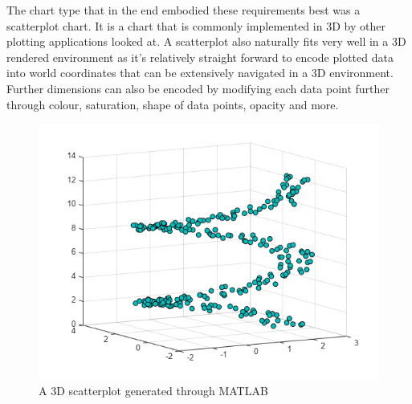 The chart type that in the end embodied these requirements best was a scatterplot chart. It is a chart that is commonly implemented in 3D by other plotting applications looked at. A scatterplot also naturally fits very well in a 3D rendered environment as it's relatively straight forward to encode plotted data into world coordinates that can be extensively navigated in a 3D environment. Further dimensions can also be encoded by modifying each data point further through colour, saturation, shape of data points, opacity and more.

\begin{figure}[h]
    \centering
    \includegraphics[width=1\columnwidth]{author-files/figures/SetMarkerPropertiesExample_01_MATLAB.png}
    \caption{A 3D scatterplot generated through MATLAB}
    \label{fig:MatlabPlot}
\end{figure}


